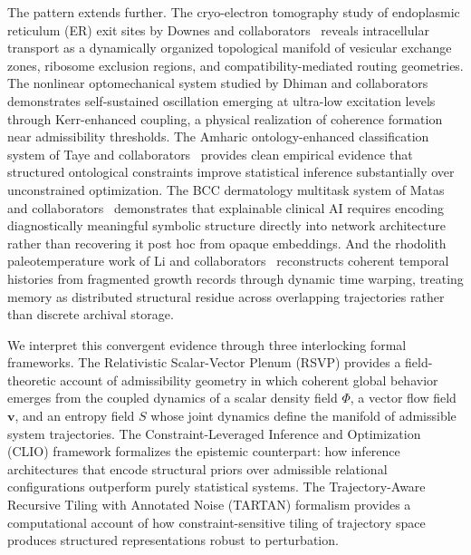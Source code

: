 \documentclass[11pt, oneside]{article}
\numberwithin{equation}{section}
\theoremstyle{rsvpstyle}
\theoremstyle{remark}
\newcommand{\vfield}{\mathbf{v}}
\begin{document}
The pattern extends further. The cryo-electron tomography study of endoplasmic reticulum
(ER) exit sites by Downes and collaborators~\cite{Downes2026ERES} reveals intracellular
transport as a dynamically organized topological manifold of vesicular exchange zones,
ribosome exclusion regions, and compatibility-mediated routing geometries. The nonlinear
optomechanical system studied by Dhiman and collaborators~\cite{Dhiman2026Optomechanics}
demonstrates self-sustained oscillation emerging at ultra-low excitation levels through
Kerr-enhanced coupling, a physical realization of coherence formation near admissibility
thresholds. The Amharic ontology-enhanced classification system of Taye and collaborators~\cite{Taye2026Amharic}
provides clean empirical evidence that structured ontological constraints improve
statistical inference substantially over unconstrained optimization. The BCC dermatology
multitask system of Matas and collaborators~\cite{Matas2026BCC} demonstrates that
explainable clinical AI requires encoding diagnostically meaningful symbolic structure
directly into network architecture rather than recovering it post hoc from opaque
embeddings. And the rhodolith paleotemperature work of Li and collaborators~\cite{Li2026Rhodoliths}
reconstructs coherent temporal histories from fragmented growth records through
dynamic time warping, treating memory as distributed structural residue across
overlapping trajectories rather than discrete archival storage.

We interpret this convergent evidence through three interlocking formal frameworks. The
Relativistic Scalar-Vector Plenum (RSVP) provides a field-theoretic account of
admissibility geometry in which coherent global behavior emerges from the coupled dynamics
of a scalar density field $\Phi$, a vector flow field $\vfield$, and an entropy field
$S$ whose joint dynamics define the manifold of admissible system trajectories. The
Constraint-Leveraged Inference and Optimization (CLIO) framework formalizes the
epistemic counterpart: how inference architectures that encode structural priors over
admissible relational configurations outperform purely statistical systems. The
Trajectory-Aware Recursive Tiling with Annotated Noise (TARTAN) formalism provides
a computational account of how constraint-sensitive tiling of trajectory space produces
structured representations robust to perturbation.
\end{document}
